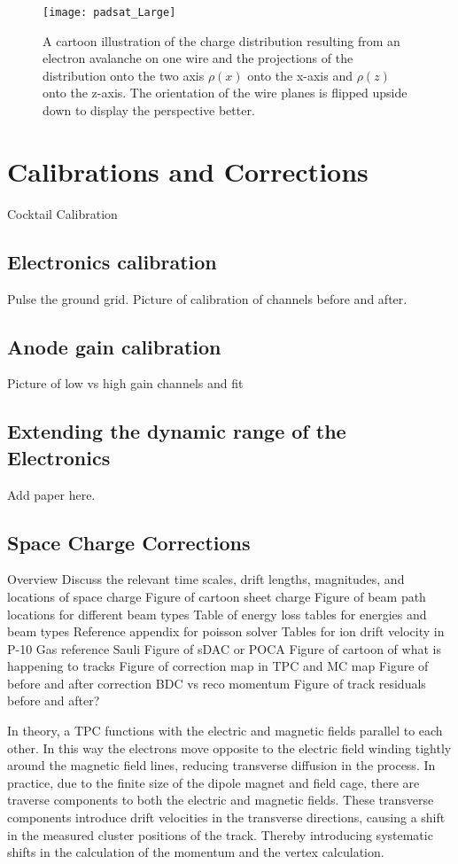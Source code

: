 \begin{figure}[H]
\texttt{[image: padsat\_Large]}
\caption{A cartoon illustration of the charge distribution resulting from an electron avalanche on one wire and the projections of the distribution onto the two axis $\rho(x)$ onto the x-axis and $\rho(z)$ onto the z-axis. The orientation of the wire planes is flipped upside down to display the perspective better.}
\label{fig:prf}
\end{figure}



\section{Calibrations and Corrections}
Cocktail Calibration 

\subsection{Electronics calibration}
Pulse the ground grid. 
Picture of calibration of channels before and after.

\subsection{Anode gain calibration}
Picture of low vs high gain channels and fit

\subsection{Extending the dynamic range of the Electronics}
Add paper here. 

\subsection{Space Charge Corrections}
Overview
Discuss the relevant time scales, drift lengths, magnitudes, and locations of space charge
Figure of cartoon sheet charge
Figure of beam path locations for different beam types
Table of energy loss tables for energies and beam types
Reference appendix for poisson solver 
Tables for ion drift velocity in P-10 Gas reference Sauli
Figure of sDAC or POCA 
Figure of cartoon of what is happening to tracks
Figure of correction map in TPC and MC map 
Figure of before and after correction BDC vs reco momentum
Figure of track residuals before and after?


In theory, a TPC functions with the electric and magnetic fields parallel to each other. In this way the electrons move opposite to the electric field winding tightly around the magnetic field lines, reducing transverse diffusion in the process. In practice, due to the finite size of the dipole magnet and field cage, there are traverse components to both the electric and magnetic fields. These transverse components introduce drift velocities in the transverse directions, causing a shift in the measured cluster positions of the track. Thereby introducing systematic shifts in the calculation of the momentum and the vertex calculation. 

